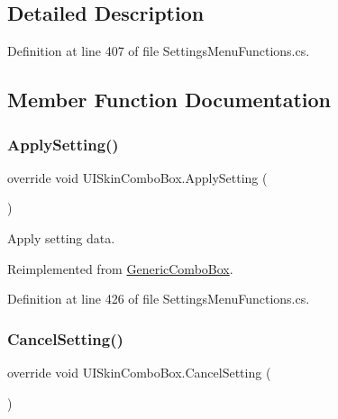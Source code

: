 \subsection{Detailed Description}


Definition at line 407 of file Settings\+Menu\+Functions.\+cs.



\subsection{Member Function Documentation}
\mbox{\label{class_u_i_skin_combo_box_a6995ec911a8cacc899e3c44aa3099fff}} 
\subsubsection{\texorpdfstring{Apply\+Setting()}{ApplySetting()}}
{\footnotesize\ttfamily override void U\+I\+Skin\+Combo\+Box.\+Apply\+Setting (\begin{DoxyParamCaption}{ }\end{DoxyParamCaption})\hspace{0.3cm}{\ttfamily [virtual]}}



Apply setting data. 



Reimplemented from \hyperlink{class_generic_combo_box_a5aced71f035bd463a4ebaaffe19ec547}{Generic\+Combo\+Box}.



Definition at line 426 of file Settings\+Menu\+Functions.\+cs.

\mbox{\label{class_u_i_skin_combo_box_adf108006beddfd416f81ec09ecd025f9}} 
\subsubsection{\texorpdfstring{Cancel\+Setting()}{CancelSetting()}}
{\footnotesize\ttfamily override void U\+I\+Skin\+Combo\+Box.\+Cancel\+Setting (\begin{DoxyParamCaption}{ }\end{DoxyParamCaption})\hspace{0.3cm}{\ttfamily [virtual]}}



